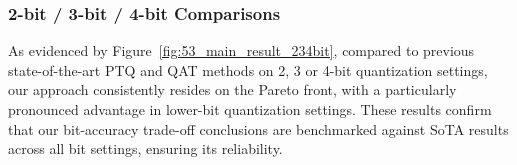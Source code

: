 \subsubsection{2-bit / 3-bit / 4-bit Comparisons}
\label{sec:exp_234_bit}
As evidenced by Figure~\ref{fig:53_main_result_234bit}, compared to previous state-of-the-art PTQ and QAT methods on 2, 3 or 4-bit quantization settings, our approach consistently resides on the Pareto front, with a particularly pronounced advantage in lower-bit quantization settings. These results confirm that our bit-accuracy trade-off conclusions are benchmarked against SoTA results across all bit settings, ensuring its reliability.